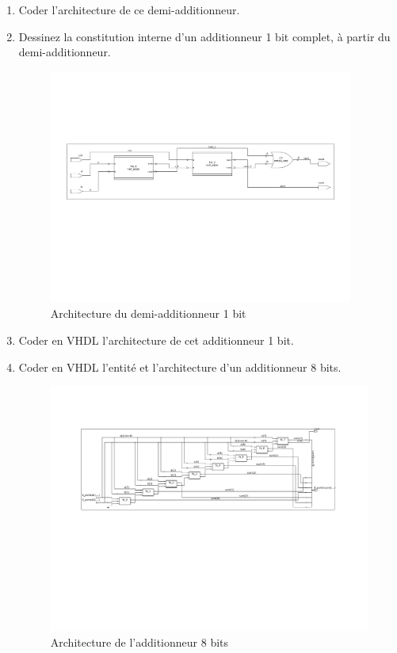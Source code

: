\documentclass[a4paper,11pt]{article}
\begin{document}
\begin{enumerate}
  \item Coder l'architecture de ce demi-additionneur.
    \lstset{inputencoding=utf8}
    

  \item Dessinez la constitution interne d'un additionneur 1 bit complet, à partir du demi-additionneur.
  \begin{figure}
    \centering
    \includegraphics[width=10cm]{./code/arch_full_adder.pdf}
    \caption{Architecture du demi-additionneur 1 bit}
    \label{fig:ha}
  \end{figure}

  \item Coder en VHDL l'architecture de cet additionneur 1 bit.
  

  \item Coder en VHDL l'entité et l'architecture d'un additionneur 8 bits.
  
  \begin{figure}
    \centering
    \includegraphics[width=15cm]{./code/arch_adder8b.pdf}
    \caption{Architecture de l'additionneur 8 bits}
    \label{fig:ha}
  \end{figure}


\end{enumerate}
\end{document}

